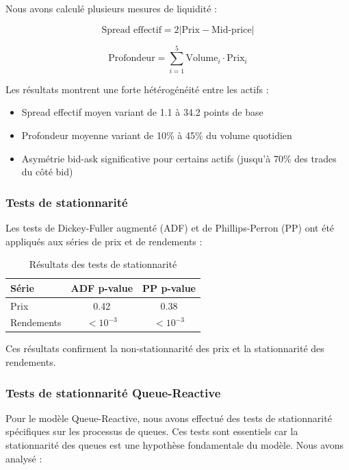 \documentclass[12pt,a4paper]{article}
\theoremstyle{definition}
\theoremstyle{remark}
\begin{document}
Nous avons calculé plusieurs mesures de liquidité :

\begin{equation}
\text{Spread effectif} = 2|\text{Prix} - \text{Mid-price}|
\end{equation}

\begin{equation}
\text{Profondeur} = \sum_{i=1}^5 \text{Volume}_i \cdot \text{Prix}_i
\end{equation}

Les résultats montrent une forte hétérogénéité entre les actifs :
\begin{itemize}
    \item Spread effectif moyen variant de 1.1 à 34.2 points de base
    \item Profondeur moyenne variant de 10\% à 45\% du volume quotidien
    \item Asymétrie bid-ask significative pour certains actifs (jusqu'à 70\% des trades du côté bid)
\end{itemize}

\subsubsection{Tests de stationnarité}

Les tests de Dickey-Fuller augmenté (ADF) et de Phillips-Perron (PP) ont été appliqués aux séries de prix et de rendements :

\begin{table}[h!]
\centering
\begin{tabular}{lcc}
\toprule
Série & ADF p-value & PP p-value \\
\midrule
Prix & 0.42 & 0.38 \\
Rendements & $< 10^{-3}$ & $< 10^{-3}$ \\
\bottomrule
\end{tabular}
\caption{Résultats des tests de stationnarité}
\end{table}

Ces résultats confirment la non-stationnarité des prix et la stationnarité des rendements.

\subsubsection{Tests de stationnarité Queue-Reactive}

Pour le modèle Queue-Reactive, nous avons effectué des tests de stationnarité spécifiques sur les processus de queues. Ces tests sont essentiels car la stationnarité des queues est une hypothèse fondamentale du modèle. Nous avons analysé :
\end{document}
